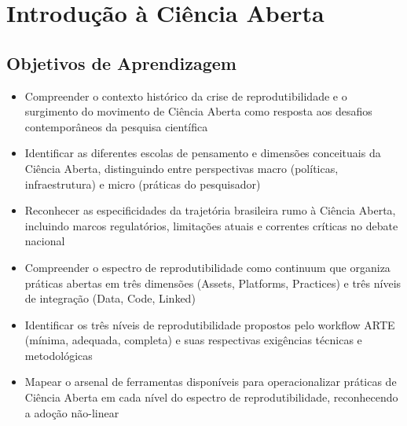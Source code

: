 \documentclass[
  a4paper,
]{book}
\providecommand{\tightlist}{%
  \setlength{\itemsep}{0pt}\setlength{\parskip}{0pt}}\usepackage{longtable,booktabs,array}
\newcommand{\emojitext}[1]{{\emoji #1}}
\begin{document}

\chapter{Introdução à Ciência Aberta}\label{sec-intro}

\section{Objetivos de Aprendizagem}\label{objetivos-de-aprendizagem}

\begin{tcolorbox}[enhanced jigsaw, colback=white, toptitle=1mm, opacityback=0, left=2mm, rightrule=.15mm, title={\emojitext{🎯} Ao final deste módulo, você será capaz de:}, coltitle=black, opacitybacktitle=0.6, breakable, toprule=.15mm, bottomtitle=1mm, titlerule=0mm, bottomrule=.15mm, arc=.35mm, leftrule=.75mm, colframe=quarto-callout-tip-color-frame, colbacktitle=quarto-callout-tip-color!10!white]

\begin{itemize}
\tightlist
\item
  Compreender o contexto histórico da crise de reprodutibilidade e o
  surgimento do movimento de Ciência Aberta como resposta aos desafios
  contemporâneos da pesquisa científica
\item
  Identificar as diferentes escolas de pensamento e dimensões
  conceituais da Ciência Aberta, distinguindo entre perspectivas macro
  (políticas, infraestrutura) e micro (práticas do pesquisador)
\item
  Reconhecer as especificidades da trajetória brasileira rumo à Ciência
  Aberta, incluindo marcos regulatórios, limitações atuais e correntes
  críticas no debate nacional
\item
  Compreender o espectro de reprodutibilidade como continuum que
  organiza práticas abertas em três dimensões (Assets, Platforms,
  Practices) e três níveis de integração (Data, Code, Linked)
\item
  Identificar os três níveis de reprodutibilidade propostos pelo
  workflow ARTE (mínima, adequada, completa) e suas respectivas
  exigências técnicas e metodológicas
\item
  Mapear o arsenal de ferramentas disponíveis para operacionalizar
  práticas de Ciência Aberta em cada nível do espectro de
  reprodutibilidade, reconhecendo a adoção não-linear
\end{itemize}

\end{tcolorbox}
\end{document}
